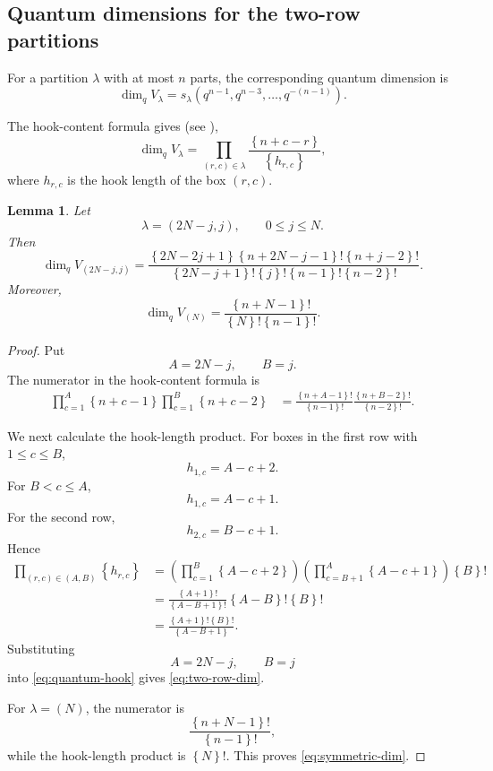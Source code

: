 \documentclass[11pt]{amsart}
\newtheorem{lemma}[theorem]{Lemma}
\newcommand{\curly}[1]{\left\{#1\right\}}
\begin{document}
\subsection{Quantum dimensions for the two-row partitions}


For a partition \(\lambda\) with at most \(n\) parts, the corresponding
quantum dimension is
\[
\dim_q V_\lambda
=
s_\lambda(q^{n-1},q^{n-3},\ldots,q^{-(n-1)}).
\]

The hook-content formula gives (see \cite{Macdonald}),
\begin{equation}\label{eq:quantum-hook}
\dim_qV_\lambda
=
\prod_{(r,c)\in\lambda}
\frac{\curly{n+c-r}}{\curly{h_{r,c}}},
\end{equation}
where \(h_{r,c}\) is the hook length of the box \((r,c)\).

\begin{lemma}\label{lem:two-row-dimension}
Let
\[
\lambda=(2N-j,j),
\qquad
0\leq j\leq N.
\]
Then
\begin{equation}\label{eq:two-row-dim}
\dim_qV_{(2N-j,j)}
=
\frac{
\curly{2N-2j+1}
\curly{n+2N-j-1}!
\curly{n+j-2}!
}{
\curly{2N-j+1}!
\curly{j}!
\curly{n-1}!
\curly{n-2}!
}.
\end{equation}
Moreover,
\begin{equation}\label{eq:symmetric-dim}
\dim_qV_{(N)}
=
\frac{
\curly{n+N-1}!
}{
\curly{N}!\curly{n-1}!
}.
\end{equation}
\end{lemma}

\begin{proof}
Put
\[
A=2N-j,\qquad B=j.
\]
The numerator in the hook-content formula is
\begin{align*}
\prod_{c=1}^{A}\curly{n+c-1}
\prod_{c=1}^{B}\curly{n+c-2}
&=
\frac{\curly{n+A-1}!}{\curly{n-1}!}
\frac{\curly{n+B-2}!}{\curly{n-2}!}.
\end{align*}

We next calculate the hook-length product.
For boxes in the first row with \(1\leq c\leq B\),
\[
h_{1,c}=A-c+2.
\]
For \(B<c\leq A\),
\[
h_{1,c}=A-c+1.
\]
For the second row,
\[
h_{2,c}=B-c+1.
\]
Hence
\begin{align*}
\prod_{(r,c)\in(A,B)}\curly{h_{r,c}}
&=
\left(
\prod_{c=1}^{B}\curly{A-c+2}
\right)
\left(
\prod_{c=B+1}^{A}\curly{A-c+1}
\right)
\curly{B}!
\\
&=
\frac{\curly{A+1}!}{\curly{A-B+1}!}
\curly{A-B}!
\curly{B}!
\\
&=
\frac{
\curly{A+1}!\curly{B}!
}{
\curly{A-B+1}
}.
\end{align*}
Substituting
\[
A=2N-j,\qquad B=j
\]
into \eqref{eq:quantum-hook} gives
\eqref{eq:two-row-dim}.

For \(\lambda=(N)\), the numerator is
\[
\frac{\curly{n+N-1}!}{\curly{n-1}!},
\]
while the hook-length product is \(\curly{N}!\).
This proves \eqref{eq:symmetric-dim}.
\end{proof}
\end{document}
